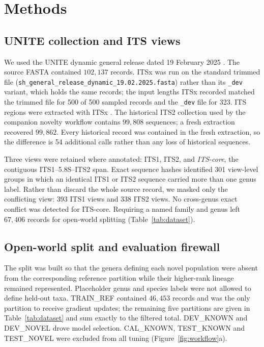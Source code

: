 \documentclass[11pt]{article}
\begin{document}
\section{Methods}
\subsection{UNITE collection and ITS views}
We used the UNITE dynamic general release dated 19 February 2025
\cite{nilsson2019unite,unite2025release}. The source FASTA contained $102{,}137$
records. ITSx was run on the standard trimmed file
(\texttt{sh\_general\_release\_dynamic\_19.02.2025.fasta}) rather than its
\texttt{\_dev} variant, which holds the same records; the input lengths ITSx
recorded matched the trimmed file for 500 of 500 sampled records and the
\texttt{\_dev} file for 323. ITS regions were extracted with ITSx \cite{bengtsson2013itsx}. The
historical ITS2 collection used by the companion novelty workflow contains
$99{,}808$ sequences; a fresh extraction recovered $99{,}862$. Every historical
record was contained in the fresh extraction, so the difference is 54 additional
calls rather than any loss of historical sequences.

Three views were retained where annotated: ITS1, ITS2, and \emph{ITS-core}, the
contiguous ITS1--5.8S--ITS2 span. Exact sequence hashes identified 301
view-level groups in which an identical ITS1 or ITS2 sequence carried more than
one genus label. Rather than discard the whole source record, we masked only the
conflicting view: 393 ITS1 views and 338 ITS2 views. No cross-genus exact
conflict was detected for ITS-core. Requiring a named family and genus left
$67{,}406$ records for open-world splitting (Table~\ref{tab:dataset}).



\subsection{Open-world split and evaluation firewall}
\label{sec:split}
The split was built so that the genera defining each novel population were
absent from the corresponding reference partition while their higher-rank
lineage remained represented. Placeholder genus and species labels were not
allowed to define held-out taxa. TRAIN\_REF contained $46{,}453$ records and was
the only partition to receive gradient updates; the remaining five partitions
are given in Table~\ref{tab:dataset} and sum exactly to the filtered total.
DEV\_KNOWN and DEV\_NOVEL drove model selection. CAL\_KNOWN, TEST\_KNOWN and
TEST\_NOVEL were excluded from all tuning (Figure~\ref{fig:workflow}a).
\end{document}
